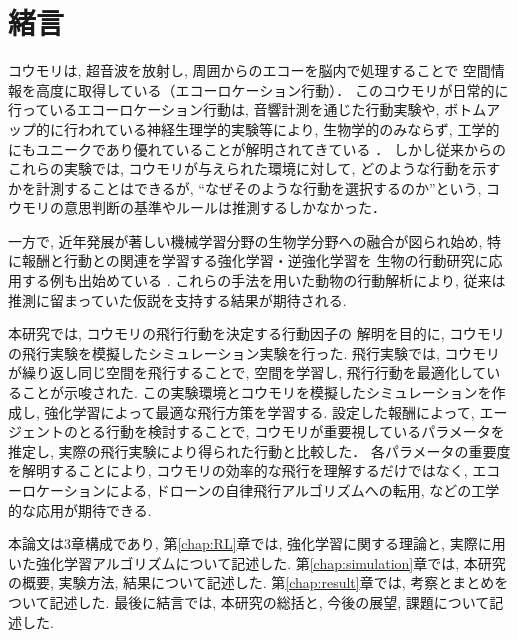 \documentclass[../main]{subfiles}
\begin{document}
\newpage
\chapter*{緒言}

コウモリは, 超音波を放射し, 周囲からのエコーを脳内で処理することで
空間情報を高度に取得している（エコーロケーション行動）．
このコウモリが日常的に行っているエコーロケーション行動は, 
音響計測を通じた行動実験や, 
ボトムアップ的に行われている神経生理学的実験等により, 
生物学的のみならず, 
工学的にもユニークであり優れていることが解明されてきている
\cite{ref:bat_enhance}\cite{ref:echolocating_bats}．
しかし従来からのこれらの実験では, 
コウモリが与えられた環境に対して, 
どのような行動を示すかを計測することはできるが, 
“なぜそのような行動を選択するのか”という, 
コウモリの意思判断の基準やルールは推測するしかなかった．

一方で, 近年発展が著しい機械学習分野の生物学分野への融合が図られ始め, 
特に報酬と行動との関連を学習する強化学習・逆強化学習を
生物の行動研究に応用する例も出始めている
\cite{ref:simulating_bout}\cite{ref:can_ai}.
これらの手法を用いた動物の行動解析により, 
従来は推測に留まっていた仮説を支持する結果が期待される.

本研究では, コウモリの飛行行動を決定する行動因子の
解明を目的に, コウモリの飛行実験を模擬したシミュレーション実験を行った.
飛行実験では, コウモリが繰り返し同じ空間を飛行することで, 
空間を学習し, 飛行行動を最適化していることが示唆された.
この実験環境とコウモリを模擬したシミュレーションを作成し, 
強化学習によって最適な飛行方策を学習する.
設定した報酬によって, エージェントのとる行動を検討することで, 
コウモリが重要視しているパラメータを推定し, 
実際の飛行実験により得られた行動と比較した．
各パラメータの重要度を解明することにより, 
コウモリの効率的な飛行を理解するだけではなく, 
エコーロケーションによる, 
ドローンの自律飛行アルゴリズムへの転用, 
などの工学的な応用が期待できる.

本論文は3章構成であり, 
第\ref{chap:RL}章では, 
強化学習に関する理論と, 
実際に用いた強化学習アルゴリズムについて記述した.
第\ref{chap:simulation}章では, 
本研究の概要, 実験方法, 結果について記述した.
第\ref{chap:result}章では, 
考察とまとめをついて記述した.
最後に結言では, 本研究の総括と, 
今後の展望, 課題について記述した.
\end{document}
